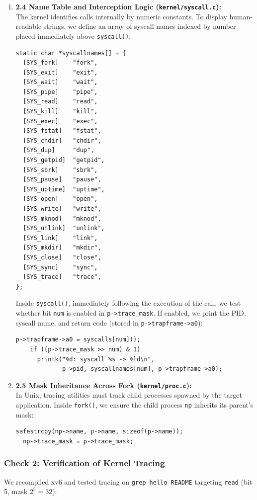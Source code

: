 \documentclass{labreport}
\begin{document}
\begin{enumerate}[leftmargin=*]
    \item \textbf{2.4 Name Table and Interception Logic (\texttt{kernel/syscall.c}):}\\
    The kernel identifies calls internally by numeric constants. To display human-readable strings, we define an array of syscall names indexed by number placed immediately above \texttt{syscall()}:
\begin{lstlisting}[style=c]
static char *syscallnames[] = {
  [SYS_fork]    "fork",
  [SYS_exit]    "exit",
  [SYS_wait]    "wait",
  [SYS_pipe]    "pipe",
  [SYS_read]    "read",
  [SYS_kill]    "kill",
  [SYS_exec]    "exec",
  [SYS_fstat]   "fstat",
  [SYS_chdir]   "chdir",
  [SYS_dup]     "dup",
  [SYS_getpid]  "getpid",
  [SYS_sbrk]    "sbrk",
  [SYS_pause]   "pause",
  [SYS_uptime]  "uptime",
  [SYS_open]    "open",
  [SYS_write]   "write",
  [SYS_mknod]   "mknod",
  [SYS_unlink]  "unlink",
  [SYS_link]    "link",
  [SYS_mkdir]   "mkdir",
  [SYS_close]   "close",
  [SYS_sync]    "sync",
  [SYS_trace]   "trace",
};
\end{lstlisting}
    Inside \texttt{syscall()}, immediately following the execution of the call, we test whether bit \texttt{num} is enabled in \texttt{p->trace\_mask}. If enabled, we print the PID, syscall name, and return code (stored in \texttt{p->trapframe->a0}):
\begin{lstlisting}[style=c]
    p->trapframe->a0 = syscalls[num]();
    if ((p->trace_mask >> num) & 1)
      printk("%d: syscall %s -> %ld\n",
             p->pid, syscallnames[num], p->trapframe->a0);
\end{lstlisting}

    \item \textbf{2.5 Mask Inheritance Across Fork (\texttt{kernel/proc.c}):}\\
    In Unix, tracing utilities must track child processes spawned by the target application. Inside \texttt{fork()}, we ensure the child process \texttt{np} inherits its parent's mask:
\begin{lstlisting}[style=c]
  safestrcpy(np->name, p->name, sizeof(p->name));
  np->trace_mask = p->trace_mask;
\end{lstlisting}
\end{enumerate}

\subsubsection{Check 2: Verification of Kernel Tracing}
We recompiled xv6 and tested tracing on \texttt{grep hello README} targeting \texttt{read} (bit 5, mask $2^5 = 32$):
\end{document}
